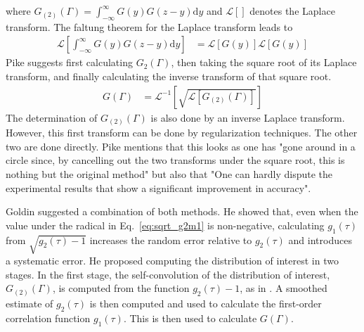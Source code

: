 where $G_{(2)}(\Gamma)=\int_{-\infty}^\infty G(y) G(z-y) \mathrm{d}y$ and $\mathcal{L}\left[\right]$ denotes the Laplace transform. The faltung theorem for the Laplace transform leads to
\begin{align}
 \mathcal{L}\left[\int_{-\infty}^\infty G(y) G(z-y) \mathrm{d}y\right] &= \mathcal{L}\left[G(y)\right] \mathcal{L}\left[G(y)\right]
\end{align}
Pike \cite{Pike2002} suggests first calculating $G_2(\Gamma)$, then taking the square root of its Laplace transform, and finally calculating the inverse transform of that square root.
\begin{align}
G(\Gamma) &=
\mathcal{L}^{-1}\left[\sqrt{\mathcal{L}\left[G_{(2)}(\Gamma)\right]}\right]
\end{align}
The determination of $G_{(2)}(\Gamma)$ is also done by an inverse Laplace transform. However, this first transform can be done by regularization techniques. The other two are done directly. Pike \cite{Pike2002} mentions that this looks as one has "gone around in a circle since, by cancelling out the two transforms under the square root, this is nothing but the original method" but also that "One can hardly dispute the experimental results
that show a significant improvement in accuracy".


Goldin \cite{Goldin1991} suggested a combination of both methods. He showed that, even when the value under the radical in Eq.\ \ref{eq:sqrt_g2m1} is non-negative, calculating $g_1(\tau)$ from $\sqrt{g_2(\tau)-1}$ increases the random error relative to $g_2(\tau)$ and introduces a systematic error. He proposed computing the distribution of interest in two stages. In the first stage, the self-convolution of the distribution of interest, $G_{(2)}(\Gamma)$, is computed from the function $g_2(\tau)-1$, as in \cite{Pike2002}. A smoothed estimate of $g_2(\tau)$ is then computed and used to calculate the first-order correlation function $g_1(\tau)$. This is then used to calculate $G(\Gamma)$.

